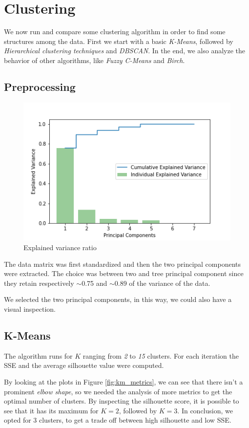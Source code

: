 \section{Clustering}
We now run and compare some clustering algorithm in order to find some structures among the data. First we start with a basic \emph{K-Means}, followed by \emph{Hierarchical clustering techniques} and \emph{DBSCAN}. In the end, we also analyze the behavior of other algorithms, like \emph{Fuzzy C-Means} and \emph{Birch}.

\subsection{Preprocessing}

\begin{figure}
\vspace{-13mm}
\centering
\captionsetup{justification=centering}
\includegraphics[width=.4\textwidth]{img/clustering/pca.png}
\caption{Explained variance ratio}
\label{fig:pca_img}
\end{figure}

The data matrix was first standardized and then the two principal components were extracted. The choice was between two and tree principal component since they retain respectively $\sim$0.75 and $\sim$0.89 of the variance of the data.

We selected the two principal components, in this way, we could also have a visual inspection.

\subsection{K-Means}
The algorithm runs for $K$ ranging from \emph{2} to \emph{15} clusters. For each iteration the SSE and the average silhouette value were computed.

By looking at the plots in Figure \ref{fig:km_metrics}, we can see that there isn't a prominent \emph{elbow shape}, so we needed the analysis of more metrics to get the optimal number of clusters. By inspecting the silhouette score, it is possible to see that it has its maximum for $K = 2$, followed by $K = 3$. In conclusion, we opted for 3 clusters, to get a trade off between high silhouette and low SSE.

